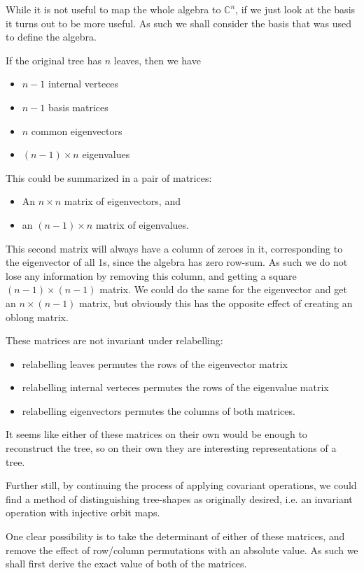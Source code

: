 \documentclass[10pt,a4paper]{report}
\newcommand{\C}{\mathbb{C}}
\begin{document}
While it is not useful to map the whole algebra to $\C^n$, if we just look at
the basis it turns out to be more useful.
As such we shall consider the basis that was used to define the algebra.

If the original tree has $n$ leaves, then we have
\begin{itemize}
	\item $n-1$ internal verteces
	\item $n-1$ basis matrices
	\item $n$ common eigenvectors
	\item $(n-1) \times n$ eigenvalues
\end{itemize}

This could be summarized in a pair of matrices:
\begin{itemize}
	\item An $n \times n$ matrix of eigenvectors, and
	\item an $(n-1) \times n$ matrix of eigenvalues.
\end{itemize}

This second matrix will always have a column of zeroes in it, corresponding to
the eigenvector of all 1s, since the algebra has zero row-sum.
As such we do not lose any information by removing this column, and getting a
square $(n-1) \times (n-1)$ matrix.
We could do the same for the eigenvector and get an $n \times (n-1)$ matrix,
but obviously this has the opposite effect of creating an oblong matrix.

These matrices are not invariant under relabelling:
\begin{itemize}
	\item relabelling leaves permutes the rows of the eigenvector matrix
	\item relabelling internal verteces permutes the rows of the eigenvalue
		matrix
	\item relabelling eigenvectors permutes the columns of both matrices.
\end{itemize}

It seems like either of these matrices on their own would be enough to
reconstruct the tree, so on their own they are interesting representations of a
tree.

Further still, by continuing the process of applying covariant operations, we
could find a method of distinguishing tree-shapes as originally desired, i.e.
an invariant operation with injective orbit maps.

One clear possibility is to take the determinant of either of these matrices,
and remove the effect of row/column permutations with an absolute value.
As such we shall first derive the exact value of both of the matrices.
\end{document}
